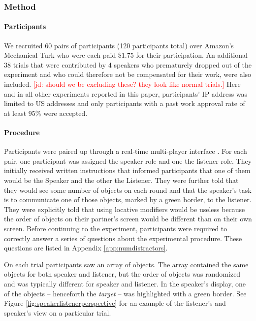 \documentclass[11pt]{article}
\newcommand{\jd}[1]{\textcolor{Red}{[jd: #1]}}
\newcommand{\figref}[1]{Figure \ref{#1}}
\newcommand{\appref}[1]{Appendix \ref{#1}}
\begin{document}
\subsubsection{Method}

\paragraph{Participants}

We recruited 60 pairs of participants (120 participants total) over Amazon's Mechanical Turk who were each paid \$1.75 for their participation. An additional 38 trials that were contributed by 4 speakers who prematurely dropped out of the experiment and who could therefore not be compensated for their work, were also included. \jd{should we be excluding these? they look like normal trials.} Here and in all other experiments reported in this paper, participants' IP address was limited to US addresses and only participants with a past work approval rate of at least 95\% were accepted. %

\paragraph{Procedure}

Participants were paired up through a real-time multi-player interface \cite{Hawkins15_RealTimeWebExperiments}. For each pair, one participant was assigned the speaker role and one the listener role. They  initially received written instructions that informed participants that one of them would be the Speaker and the other the Listener. They were further told that they would see some number of objects on each round and that the speaker's task is to communicate one of those objects, marked by a green border, to the listener. They were explicitly told that using locative modifiers would be useless because the order of objects on their partner's screen would be different than on their own screen. Before continuing to the experiment, participants were required to correctly answer a series of questions about the experimental procedure. These questions are listed in \appref{app:numdistractors}.

On each trial participants saw an array of objects. The array contained the same objects for both speaker and listener, but the order of objects was randomized and was typically different for speaker and listener. In the speaker's display, one of the objects -- henceforth the \emph{target} -- was highlighted with a green border. See \figref{fig:speakerlistenerperspective} for an example of the listener's and speaker's view on a particular trial.
\end{document}
